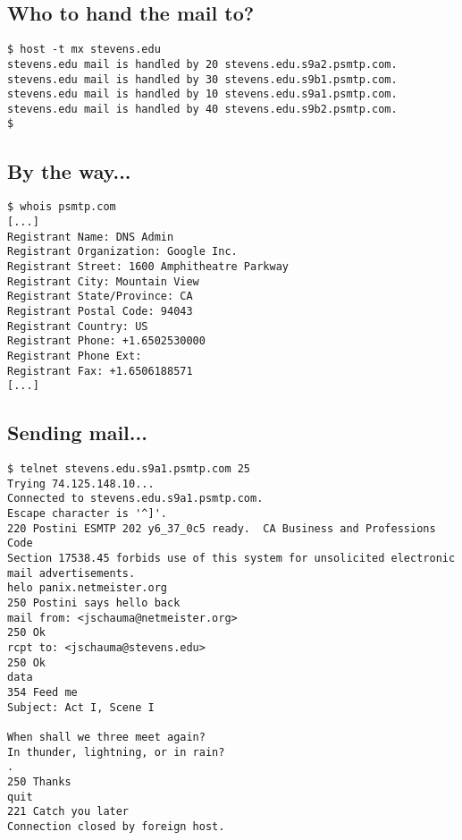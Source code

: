 \documentclass[xga]{xdvislides}
\begin{document}
\subsection{Who to hand the mail to?}
\newcommand{\smallish}{\fontsize{16}{16}\selectfont}
\begin{verbatim}
$ host -t mx stevens.edu
stevens.edu mail is handled by 20 stevens.edu.s9a2.psmtp.com.
stevens.edu mail is handled by 30 stevens.edu.s9b1.psmtp.com.
stevens.edu mail is handled by 10 stevens.edu.s9a1.psmtp.com.
stevens.edu mail is handled by 40 stevens.edu.s9b2.psmtp.com.
$
\end{verbatim}
\Normalsize

\subsection{By the way...}
\begin{verbatim}
$ whois psmtp.com
[...]
Registrant Name: DNS Admin
Registrant Organization: Google Inc.
Registrant Street: 1600 Amphitheatre Parkway
Registrant City: Mountain View
Registrant State/Province: CA
Registrant Postal Code: 94043
Registrant Country: US
Registrant Phone: +1.6502530000
Registrant Phone Ext:
Registrant Fax: +1.6506188571
[...]
\end{verbatim}

\subsection{Sending mail...}
\smallish
\begin{verbatim}
$ telnet stevens.edu.s9a1.psmtp.com 25
Trying 74.125.148.10...
Connected to stevens.edu.s9a1.psmtp.com.
Escape character is '^]'.
220 Postini ESMTP 202 y6_37_0c5 ready.  CA Business and Professions Code
Section 17538.45 forbids use of this system for unsolicited electronic
mail advertisements.
helo panix.netmeister.org
250 Postini says hello back
mail from: <jschauma@netmeister.org>
250 Ok
rcpt to: <jschauma@stevens.edu>
250 Ok
data
354 Feed me
Subject: Act I, Scene I

When shall we three meet again?
In thunder, lightning, or in rain?
.
250 Thanks
quit
221 Catch you later
Connection closed by foreign host.
\end{verbatim}
\Normalsize
\end{document}
